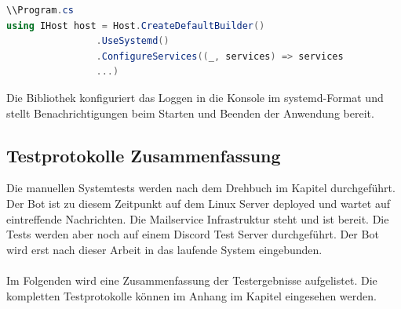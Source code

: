 \documentclass[a4paper, table]{article}
\begin{document}
\begin{lstlisting}[language=csharp]
\\Program.cs
using IHost host = Host.CreateDefaultBuilder()
                .UseSystemd()
                .ConfigureServices((_, services) => services
                ...)
\end{lstlisting}

Die Bibliothek konfiguriert das Loggen in die Konsole im systemd-Format und stellt Benachrichtigungen beim Starten und Beenden der Anwendung bereit.

\newpage
\subsection{Testprotokolle Zusammenfassung}
Die manuellen Systemtests werden nach dem Drehbuch im Kapitel  durchgeführt.
Der Bot ist zu diesem Zeitpunkt auf dem Linux Server deployed und wartet auf eintreffende Nachrichten. 
Die Mailservice Infrastruktur steht und ist bereit. 
Die Tests werden aber noch auf einem Discord Test Server durchgeführt. 
Der Bot wird erst nach dieser Arbeit in das laufende System eingebunden.\\\\
Im Folgenden wird eine Zusammenfassung der Testergebnisse aufgelistet. 
Die kompletten Testprotokolle können im Anhang im Kapitel  eingesehen werden.
\end{document}
